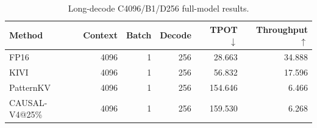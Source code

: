 \begin{table}[t]
\centering
\small
\caption{Long-decode C4096/B1/D256 full-model results.}
\label{tab:long-decode}
\begin{tabular}{lrrrrr}
\toprule
Method & Context & Batch & Decode & TPOT $\downarrow$ & Throughput $\uparrow$ \\
\midrule
FP16 & 4096 & 1 & 256 & 28.663 & 34.888 \\
KIVI & 4096 & 1 & 256 & 56.832 & 17.596 \\
PatternKV & 4096 & 1 & 256 & 154.646 & 6.466 \\
CAUSAL-V4@25\% & 4096 & 1 & 256 & 159.530 & 6.268 \\
\bottomrule
\end{tabular}
\end{table}
